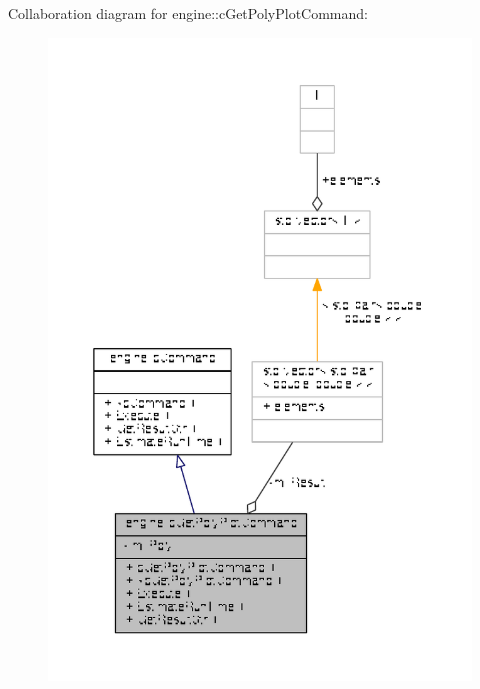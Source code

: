 Collaboration diagram for engine\-:\-:c\-Get\-Poly\-Plot\-Command\-:
\nopagebreak
\begin{figure}[H]
\begin{center}
\leavevmode
\includegraphics[width=350pt]{classengine_1_1cGetPolyPlotCommand__coll__graph}
\end{center}
\end{figure}
